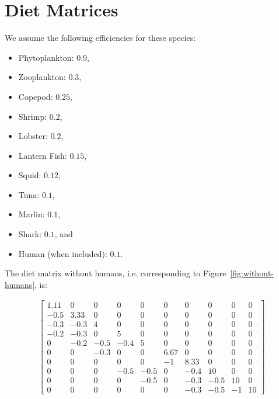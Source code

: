 \section{Diet Matrices}
\label{sec:diet-matrices}

We assume the following efficiencies for these species:

\begin{itemize}
    \item Phytoplankton: $0.9$,
    \item Zooplankton: $0.3$,
    \item Copepod: $0.25$,
    \item Shrimp: $0.2$,
    \item Lobster: $0.2$,
    \item Lantern Fish: $0.15$,
    \item Squid: $0.12$,
    \item Tuna: $0.1$,
    \item Marlin: $0.1$,
    \item Shark: $0.1$, and
    \item Human (when included): $0.1$.
\end{itemize}

\newpage

The diet matrix without humans, i.e. corresponding to Figure~\ref{fig:without-humans}, is:

\begin{gather*}
    \begin{bmatrix}
        1.11 & 0 & 0 & 0 & 0 & 0 & 0 & 0 & 0 & 0 \\
        -0.5 & 3.33 & 0 & 0 & 0 & 0 & 0 & 0 & 0 & 0 \\
        -0.3 & -0.3 & 4 & 0 & 0 & 0 & 0 & 0 & 0 & 0 \\
        -0.2 & -0.3 & 0 & 5 & 0 & 0 & 0 & 0 & 0 & 0 \\
        0 & -0.2 & -0.5 & -0.4 & 5 & 0 & 0 & 0 & 0 & 0 \\
        0 & 0 & -0.3 & 0 & 0 & 6.67 & 0 & 0 & 0 & 0 \\
        0 & 0 & 0 & 0 & 0 & -1 & 8.33 & 0 & 0 & 0 \\
        0 & 0 & 0 & -0.5 & -0.5 & 0 & -0.4 & 10 & 0 & 0 \\
        0 & 0 & 0 & 0 & -0.5 & 0 & -0.3 & -0.5 & 10 & 0 \\
        0 & 0 & 0 & 0 & 0 & 0 & -0.3 & -0.5 & -1 & 10
    \end{bmatrix}
\end{gather*}

